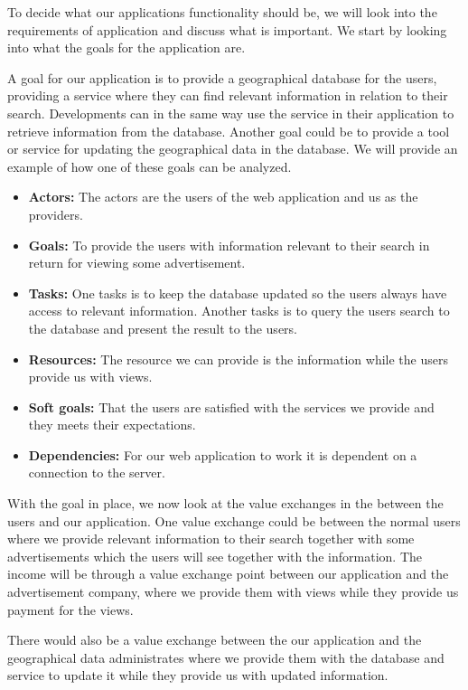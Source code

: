 To decide what our applications functionality should be, we will look into the requirements of application and discuss what is important. We start by looking into what the goals for the application are.

A goal for our application is to provide a geographical database for the users, providing a service where they can find relevant information in relation to their search. Developments can in the same way use the service in their application to retrieve information from the database. Another goal could be to provide a tool or service for updating the geographical data in the database. We will provide an example of how one of these goals can be analyzed.

\begin{itemize}

\item \textbf{Actors:} The actors are the users of the web application and us as the providers. 
\item \textbf{Goals:} To provide the users with information relevant to their search in return for viewing some advertisement.
\item \textbf{Tasks:} One tasks is to keep the database updated so the users always have access to relevant information. Another tasks is to query the users search to the database and present the result to the users.
\item \textbf{Resources:} The resource we can provide is the information while the users provide us with views.
\item \textbf{Soft goals:} That the users are satisfied with the services we provide and they meets their expectations.
\item \textbf{Dependencies:} For our web application to work it is dependent on a connection to the server.

\end{itemize}

With the goal in place, we now look at the value exchanges in the between the users and our application. One value exchange could be between the normal users where we provide relevant information to their search together with some advertisements which the users will see together with the information. The income will be through a value exchange point between our application and the advertisement company, where we provide them with views while they provide us payment for the views.

There would also be a value exchange between the our application and the geographical data administrates where we provide them with the database and service to update it while they provide us with updated information.

